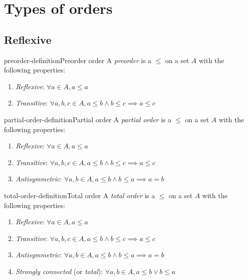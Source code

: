 \documentclass[preview]{standalone}
\begin{document}
\genpage

\section{Types of orders}

\subsection{Reflexive}

\begin{snippetdefinition}{preorder-definition}{Preorder order}
    A \textit{preorder} is a \homrelation \(\leq\) on a set \(A\)
    with the following properties:
    \begin{enumerate}
        \item \textit{Reflexive}: \(\forall a \in A, a \leq a\)
        \item \textit{Transitive}: \(\forall a,b,c \in A, a \leq b \land b \leq c \implies a \leq c\)
    \end{enumerate}
\end{snippetdefinition}

\begin{snippetdefinition}{partial-order-definition}{Partial order}
    A \textit{partial order} is a \homrelation \(\leq\) on a set \(A\)
    with the following properties:
    \begin{enumerate}
        \item \textit{Reflexive}: \(\forall a \in A, a \leq a\)
        \item \textit{Transitive}: \(\forall a,b,c \in A, a \leq b \land b \leq c \implies a \leq c\)
        \item \textit{Antisymmetric}: \(\forall a,b \in A, a \leq b \land b \leq a \implies a=b\)
    \end{enumerate}
\end{snippetdefinition}

\begin{snippetdefinition}{total-order-definition}{Total order}
    A \textit{total order} is a \homrelation \(\leq\) on a set \(A\)
    with the following properties:
    
    \begin{enumerate}
        \item \textit{Reflexive}: \(\forall a \in A, a \leq a\)
        \item \textit{Transitive}: \(\forall a,b,c \in A, a \leq b \land b \leq c \implies a \leq c\)
        \item \textit{Antisymmetric}: \(\forall a,b \in A, a \leq b \land b \leq a \implies a=b\)
        \item \textit{Strongly connected} (or \textit{total}): \(\forall a,b\in A, a \leq b \lor b\leq a\)
    \end{enumerate}
\end{snippetdefinition}
\end{document}
